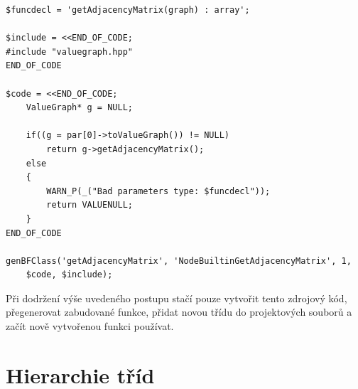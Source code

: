 \documentclass[11pt,twoside,a4paper]{book}
\begin{document}
\begin{verbatim}
$funcdecl = 'getAdjacencyMatrix(graph) : array';

$include = <<END_OF_CODE;
#include "valuegraph.hpp"
END_OF_CODE

$code = <<END_OF_CODE;
    ValueGraph* g = NULL;

    if((g = par[0]->toValueGraph()) != NULL)
        return g->getAdjacencyMatrix();
    else
    {
        WARN_P(_("Bad parameters type: $funcdecl"));
        return VALUENULL;
    }
END_OF_CODE

genBFClass('getAdjacencyMatrix', 'NodeBuiltinGetAdjacencyMatrix', 1,
    $code, $include);
\end{verbatim}

Při dodržení výše uvedeného postupu stačí pouze vytvořit tento zdrojový kód, přegenerovat zabudované funkce, přidat novou třídu do projektových souborů a začít nově vytvořenou funkci používat.



\twocolumn

\chapter{Hierarchie tříd}
\label{hierarchie_trid}
\end{document}

